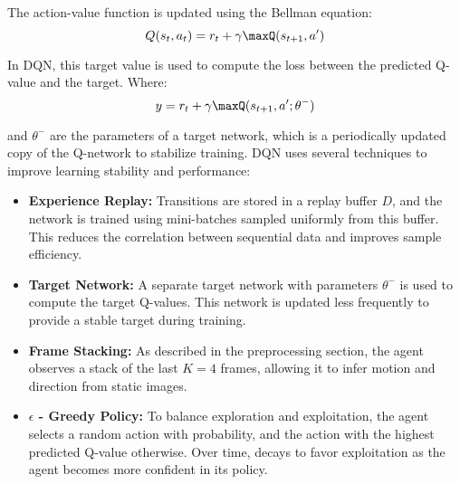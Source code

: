 \documentclass[conference]{IEEEtran}
\begin{document}
The action-value function is updated using the Bellman equation: $$Q(s_t, a_t) = r_t + \gamma\maxQ(s_{t+1}, a^{\prime})$$ 

In DQN, this target value is used to compute the loss between the predicted Q-value and the target. Where: $$y = r_t + \gamma\maxQ(s_{t+1}, a^{\prime}; \theta^{-})$$

and $\theta^{-}$ are the parameters of a target network, which is a periodically updated copy of the Q-network to stabilize training. DQN uses several techniques to improve learning stability and performance: 
\begin{itemize}
    \item \textbf{Experience Replay:} Transitions are stored in a replay buffer $D$, and the network is trained using mini-batches sampled uniformly from this buffer. This reduces the correlation between sequential data and improves sample efficiency.
    \item \textbf{Target Network:} A separate target network with parameters $\theta^{-}$ is used to compute the target Q-values. This network is updated less frequently to provide a stable target during training.
    \item \textbf{Frame Stacking:} As described in the preprocessing section, the agent observes a stack of the last $K = 4$ frames, allowing it to infer motion and direction from static images.
    \item \textbf{$\epsilon$ - Greedy Policy:} To balance exploration and exploitation, the agent selects a random action with probability, and the action with the highest predicted Q-value otherwise. Over time, decays to favor exploitation as the agent becomes more confident in its policy.
\end{itemize}
\end{document}
